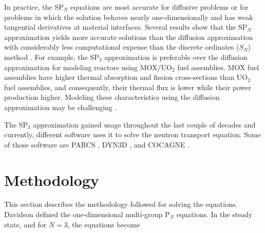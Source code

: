 \documentclass{anstrans}
\begin{document}
In practice, the SP$_N$ equations are most accurate for diffusive problems or for problems in which the solution behaves nearly one-dimensionally and has weak tangential derivatives at material interfaces.
Several results show that the SP$_N$ approximation yields more accurate solutions than the diffusion approximation \cite{mui_modified_1987} \cite{beckert_development_2007} \cite{fliscounakis_potential_2012} \cite{ryu_finite_2013} with considerably less computational expense than the discrete ordinates ($S_N$) method \cite{brantley_simplifiedP3_2000}.
For example, the SP$_3$ approximation is preferable over the diffusion approximation for modeling reactors using MOX/UO$_2$ fuel assemblies.
MOX fuel assemblies have higher thermal absorption and fission cross-sections than UO$_2$ fuel assemblies, and consequently, their thermal flux is lower while their power production higher.
Modeling these characteristics using the diffusion approximation may be challenging \cite{brantley_simplifiedP3_2000} \cite{capilla_applications_2009}.

The SP$_3$ approximation gained usage throughout the last couple of decades and currently, different software uses it to solve the neutron transport equation.
Some of those software are PARCS \cite{downar_parcs_2004}, DYN3D \cite{beckert_development_2007}, and COCAGNE \cite{fliscounakis_potential_2012}.

\section{Methodology}

This section describes the methodology followed for solving the equations.
Davidson \cite{davidson_neutron_1957} defined the one-dimensional multi-group P$_N$ equations.
In the steady state, and for $N=3$, the equations become
\end{document}
